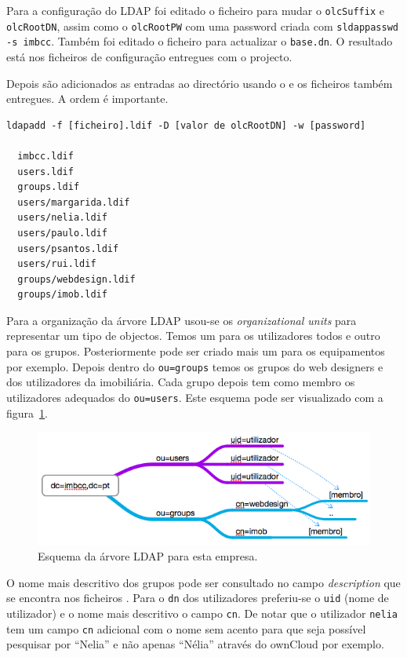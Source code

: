 \documentclass[12pt,a4paper]{report}
\begin{document}
Para a configuração do LDAP foi editado o ficheiro  para mudar o \texttt{olcSuffix} e \texttt{olcRootDN}, assim como o \texttt{olcRootPW} com uma password criada com \texttt{sldappasswd -s imbcc}. Também foi editado o ficheiro  para actualizar o \texttt{base.dn}. O resultado está nos ficheiros de configuração entregues com o projecto.

Depois são adicionados as entradas ao directório usando o  e os ficheiros  também entregues. A ordem é importante. 

\begin{verbatim}
ldapadd -f [ficheiro].ldif -D [valor de olcRootDN] -w [password]

  imbcc.ldif
  users.ldif
  groups.ldif
  users/margarida.ldif
  users/nelia.ldif
  users/paulo.ldif
  users/psantos.ldif
  users/rui.ldif
  groups/webdesign.ldif
  groups/imob.ldif
\end{verbatim}

Para a organização da árvore LDAP usou-se os \emph{organizational units} para representar um tipo de objectos. Temos um para os utilizadores todos e outro para os grupos. Posteriormente pode ser criado mais um para os equipamentos por exemplo. Depois dentro do \texttt{ou=groups} temos os grupos do web designers e dos utilizadores da imobiliária. Cada grupo depois tem como membro os utilizadores adequados do \texttt{ou=users}. Este esquema pode ser visualizado com a figura~\ref{fig:ldaptree}.

\begin{figure}[H]
\begin{center}
\includegraphics[width=\textwidth]{figs/ldap-tree.png}
\end{center}
\caption{Esquema da árvore LDAP para esta empresa.}
\label{fig:ldaptree}
\end{figure}

O nome mais descritivo dos grupos pode ser consultado no campo \emph{description} que se encontra nos ficheiros . Para o \texttt{dn} dos utilizadores preferiu-se o \texttt{uid} (nome de utilizador) e o nome mais descritivo o campo \texttt{cn}. De notar que o utilizador \texttt{nelia} tem um campo \texttt{cn} adicional com o nome sem acento para que seja possível pesquisar por ``Nelia'' e não apenas ``Nélia'' através do ownCloud por exemplo.
\end{document}
